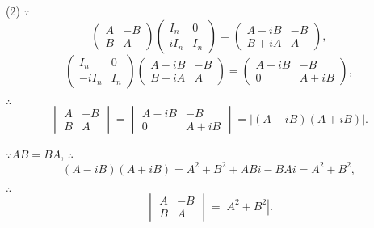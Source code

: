 \documentclass[color=black,device=normal,lang=cn,mode=geye]{elegantnote}
\begin{document}
\begin{solution}
    (2) $\because$
    \[\begin{pmatrix}
        A & -B \\
        B & A
    \end{pmatrix}\begin{pmatrix}
        I_n & 0 \\
        iI_n & I_n
    \end{pmatrix}=\begin{pmatrix}
        A-iB & -B \\
        B+iA & A
    \end{pmatrix},\]
    \[\begin{pmatrix}
        I_n & 0 \\
        -iI_n & I_n
    \end{pmatrix}\begin{pmatrix}
        A-iB & -B \\
        B+iA & A
    \end{pmatrix}=\begin{pmatrix}
        A-iB & -B \\
        0 & A+iB
    \end{pmatrix},\]

    $\therefore$
    \[\begin{vmatrix}
        A & -B \\
        B & A
    \end{vmatrix}=\begin{vmatrix}
        A-iB & -B \\
        0 & A+iB
    \end{vmatrix}=|(A-iB)(A+iB)|.\]

    $\because AB=BA$, $\therefore$
    \[(A-iB)(A+iB)=A^2+B^2+ABi-BAi=A^2+B^2,\]

    $\therefore$
    \[\begin{vmatrix}
        A & -B \\
        B & A
    \end{vmatrix}=|A^2+B^2|.\]
\end{solution}
\end{document}

